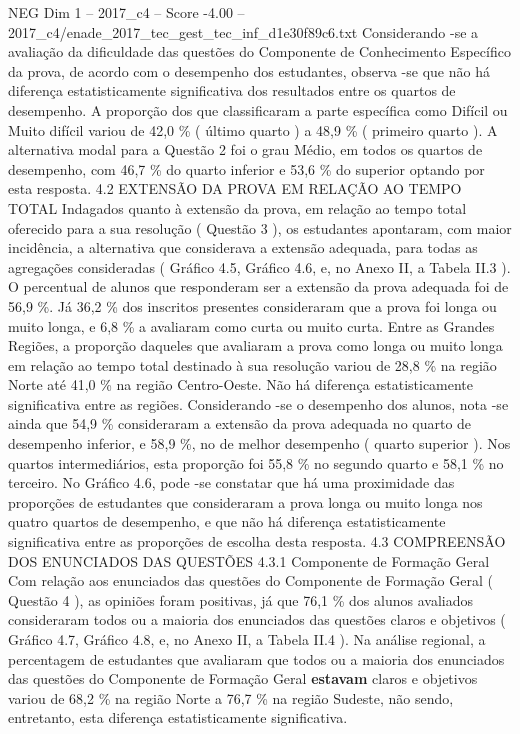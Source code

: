 \begin{textsample}{NEG Dim 1 – 2017\_c4 – Score -4.00 – 2017\_c4/enade\_2017\_tec\_gest\_tec\_inf\_d1e30f89c6.txt}
Considerando -se a avaliação da dificuldade das questões do Componente de Conhecimento Específico da prova, de acordo com o desempenho dos estudantes, observa -se que não há diferença estatisticamente significativa dos resultados entre os quartos de desempenho.
A proporção dos que classificaram a parte específica como Difícil ou Muito difícil variou de 42,0 \% ( último quarto ) a 48,9 \% ( primeiro quarto ).
A alternativa modal para a Questão 2 foi o grau Médio, em todos os quartos de desempenho, com 46,7 \% do quarto inferior e 53,6 \% do superior optando por esta resposta. 4.2 EXTENSÃO DA PROVA EM RELAÇÃO AO TEMPO TOTAL Indagados quanto à extensão da prova, em relação ao tempo total oferecido para a sua resolução ( Questão 3 ), os estudantes apontaram, com maior incidência, a alternativa que considerava a extensão adequada, para todas as agregações consideradas ( Gráfico 4.5, Gráfico 4.6, e, no Anexo II, a Tabela II.3 ).
O percentual de alunos que responderam ser a extensão da prova adequada foi de 56,9 \%.
Já 36,2 \% dos inscritos presentes consideraram que a prova foi longa ou muito longa, e 6,8 \% a avaliaram como curta ou muito curta.
Entre as Grandes Regiões, a proporção daqueles que avaliaram a prova como longa ou muito longa em relação ao tempo total destinado à sua resolução variou de 28,8 \% na região Norte até 41,0 \% na região Centro-Oeste.
Não há diferença estatisticamente significativa entre as regiões.
Considerando -se o desempenho dos alunos, nota -se ainda que 54,9 \% consideraram a extensão da prova adequada no quarto de desempenho inferior, e 58,9 \%, no de melhor desempenho ( quarto superior ).
Nos quartos intermediários, esta proporção foi 55,8 \% no segundo quarto e 58,1 \% no terceiro.
No Gráfico 4.6, pode -se constatar que há uma proximidade das proporções de estudantes que consideraram a prova longa ou muito longa nos quatro quartos de desempenho, e que não há diferença estatisticamente significativa entre as proporções de escolha desta resposta. 4.3 COMPREENSÃO DOS ENUNCIADOS DAS QUESTÕES 4.3.1 Componente de Formação Geral Com relação aos enunciados das questões do Componente de Formação Geral ( Questão 4 ), as opiniões foram positivas, já que 76,1 \% dos alunos avaliados consideraram todos ou a maioria dos enunciados das questões claros e objetivos ( Gráfico 4.7, Gráfico 4.8, e, no Anexo II, a Tabela II.4 ).
Na análise regional, a percentagem de estudantes que avaliaram que todos ou a maioria dos enunciados das questões do Componente de Formação Geral \textbf{estavam} claros e objetivos variou de 68,2 \% na região Norte a 76,7 \% na região Sudeste, não sendo, entretanto, esta diferença estatisticamente significativa.

\end{textsample}
